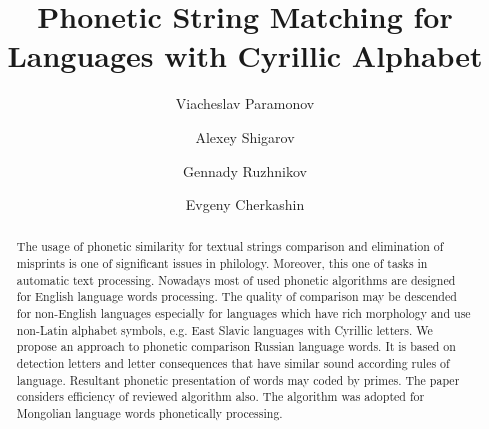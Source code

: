 \documentclass{svproc}
\begin{document}
\mainmatter              %
%
\title{Phonetic String Matching for Languages with Cyrillic Alphabet }
%
%
\author{Viacheslav Paramonov   \and Alexey Shigarov 
\and Gennady Ruzhnikov \and Evgeny Cherkashin  }
%
%
%

\maketitle              %

\begin{abstract}

The usage of phonetic similarity for textual strings comparison and elimination of misprints is  one of significant issues in philology. Moreover, this one of tasks in automatic text processing. Nowadays most of used phonetic algorithms are designed for English language words processing. The quality of comparison may be descended for non-English languages especially for languages which have rich morphology and use non-Latin alphabet symbols, e.g. East Slavic languages with Cyrillic letters. We propose an approach to phonetic comparison Russian language words. It is based on detection letters and letter consequences that have similar sound according rules of language. Resultant phonetic presentation of words may coded by primes. The paper considers efficiency of reviewed algorithm also. The algorithm was adopted for Mongolian language words phonetically processing.
\end{abstract}
\end{document}
